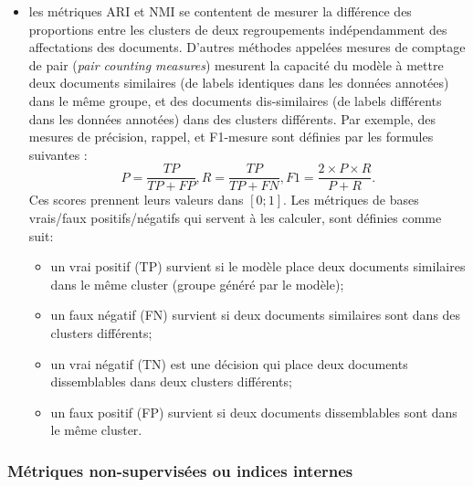 \begin{itemize}
	\item les métriques ARI et NMI se contentent de mesurer la différence des proportions entre les clusters de deux regroupements indépendamment des affectations des documents. D'autres méthodes appelées mesures de comptage de pair (\textit{pair counting measures}) mesurent la capacité du modèle à mettre deux documents similaires (de labels identiques dans les données annotées) dans le même groupe, et des documents dis-similaires (de labels différents dans les données annotées) dans des clusters différents. Par exemple, des mesures de précision, rappel, et F1-mesure sont définies par les formules suivantes \citep{manning2009irbook-flatclustering}:
	\[P = \frac{{TP}}{{TP} + {FP}}, R = \frac{{TP}}{{TP} + {FN}}, F1 = \frac{2 \times P \times R}{P + R}.\]
	Ces scores prennent leurs valeurs dans $[0;1]$. Les métriques de bases vrais/faux positifs/négatifs qui servent à les calculer, sont définies comme suit:
	\begin{itemize}
		\item un vrai positif (TP) survient si le modèle place deux documents similaires dans le même cluster (groupe généré par le modèle);
		\item un faux négatif (FN) survient si deux documents similaires sont dans des clusters différents;
		\item un vrai négatif (TN) est une décision qui place deux documents dissemblables dans deux clusters différents;
		\item un faux positif (FP) survient si deux documents dissemblables sont dans le même cluster.
	\end{itemize}
		
\end{itemize}



\subsubsection{Métriques non-supervisées ou indices internes}
\label{sec:similarite:biblio:unsupeval}

